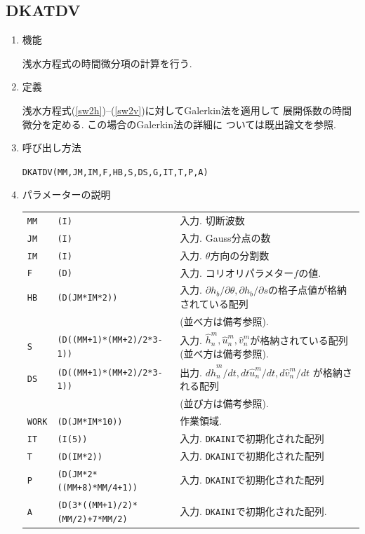 \documentclass[a4j,fleqn]{jarticle}
\begin{document}

\subsection{DKATDV}

\begin{enumerate}

\item 機能 

浅水方程式の時間微分項の計算を行う.

\item 定義

浅水方程式(\ref{sw2h})--(\ref{sw2v})に対してGalerkin法を適用して
展開係数の時間微分を定める. この場合のGalerkin法の詳細に
ついては既出論文を参照.

\item 呼び出し方法 
    
{\tt DKATDV(MM,JM,IM,F,HB,S,DS,G,IT,T,P,A)}
  
\item パラメーターの説明 
    
\begin{tabular}{lll}
{\tt MM} & {\tt (I)} & 入力. 切断波数\\
{\tt JM} & {\tt (I)} & 入力. Gauss分点の数\\
{\tt IM} & {\tt (I)} & 入力. $\theta$方向の分割数\\
{\tt F}   & {\tt (D)} & 入力. コリオリパラメター$f$の値.\\
{\tt HB}   & {\tt (D(JM*IM*2))} & 入力. $\partial h_b/\partial\theta,
\partial h_b/\partial s$の格子点値が格納されている配列\\
 & & (並べ方は備考参照).\\
{\tt S}   & {\tt (D((MM+1)*(MM+2)/2*3-1))} & 入力. $\hat h^m_n,\hat u^m_n,\hat
v^m_n$が格納されている配列(並べ方は備考参照).\\
{\tt DS}   & {\tt (D((MM+1)*(MM+2)/2*3-1))} & 出力. 
$d\hat h^m_n/dt,dt\hat u^m_n/dt,d\hat v^m_n/dt$
が格納される配列\\
 & & (並び方は備考参照).\\
{\tt WORK}   & {\tt (D(JM*IM*10))} & 作業領域.\\
{\tt IT}  & {\tt (I(5))}    & 入力. {\tt DKAINI}で初期化された配列\\
{\tt T}   & {\tt (D(IM*2))} & 入力. {\tt DKAINI}で初期化された配列\\
{\tt P}  & {\tt (D(JM*2*((MM+8)*MM/4+1))} & 入力. {\tt DKAINI}で初期化された配列\\
{\tt A}  & {\tt (D(3*((MM+1)/2)*(MM/2)+7*MM/2)} & 入力. {\tt DKAINI}で初期化された配列.
\end{tabular}


\end{enumerate}
\end{document}
